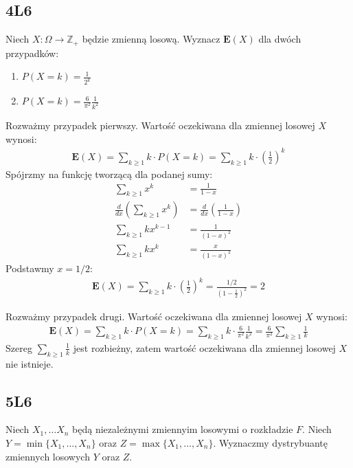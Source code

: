 \documentclass{article}
\begin{document}
\subsection{4L6}

Niech $X: \Omega \rightarrow \mathbb{Z}_{+}$ będzie zmienną losową. 
Wyznacz $\mathbf{E}(X)$ dla dwóch przypadków:
\begin{enumerate}
    \item $P(X=k) = \frac{1}{2^k}$
    \item $P(X=k)=\frac{6}{\pi^2}\frac{1}{k^2}$ 
\end{enumerate}

\noindent
Rozważmy przypadek pierwszy. Wartość oczekiwana dla zmiennej losowej $X$ wynosi:
\setcounter{equation}{0}
\begin{align}
    \mathbf{E}(X) 
    = \sum_{k\geq 1} k\cdot P(X=k) 
    = \sum_{k\geq 1} k\cdot \left(\frac{1}{2}\right)^k
\end{align}
Spójrzmy na funkcję tworzącą dla podanej sumy:
\begin{align}
    \sum_{k\geq 1} x^k &= \frac{1}{1-x}\\
    \frac{d}{dx} \left(\sum_{k\geq 1} x^k\right) &= \frac{d}{dx} \left(\frac{1}{1-x}\right)\\
    \sum_{k\geq 1} kx^{k-1} &= \frac{1}{(1-x)^2}\\
    \sum_{k\geq 1} kx^k &= \frac{x}{(1-x)^2}
\end{align}
Podstawmy $x=1/2$:
\begin{align}
    \mathbf{E}(X) = \sum_{k\geq 1} k\cdot \left(\frac{1}{2}\right)^k = \frac{1/2}{\left(1-\frac{1}{2}\right)^2} = 2
\end{align}

\noindent
Rozważmy przypadek drugi. Wartość oczekiwana dla zmiennej losowej $X$ wynosi:
\begin{align}
    \mathbf{E}(X)
    = \sum_{k\geq 1} k\cdot P(X=k) = \sum_{k\geq 1} k\cdot \frac{6}{\pi^2}\frac{1}{k^2} = \frac{6}{\pi^2}\sum_{k\geq 1} \frac{1}{k}
\end{align}
Szereg $\sum_{k\geq 1} \frac{1}{k}$ jest rozbieżny, zatem wartość oczekiwana dla zmiennej losowej $X$ nie istnieje.

\subsection{5L6}

Niech $X_1,\dots X_n$ będą niezależnymi zmiennyim losowymi o rozkładzie $F$. Niech
$Y=\min\{X_1,\dots,X_n\}$ oraz $Z=\max\{X_1,\dots,X_n\}$. Wyznaczmy dystrybuantę zmiennych losowych $Y$ oraz $Z$.\\
\end{document}
